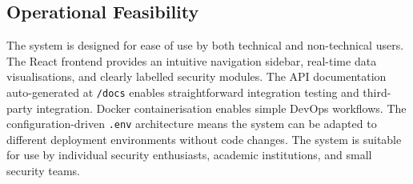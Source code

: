 \subsection*{Operational Feasibility}

The system is designed for ease of use by both technical and non-technical users. The React frontend provides an intuitive navigation sidebar, real-time data visualisations, and clearly labelled security modules. The API documentation auto-generated at \texttt{/docs} enables straightforward integration testing and third-party integration. Docker containerisation enables simple DevOps workflows. The configuration-driven \texttt{.env} architecture means the system can be adapted to different deployment environments without code changes. The system is suitable for use by individual security enthusiasts, academic institutions, and small security teams.

